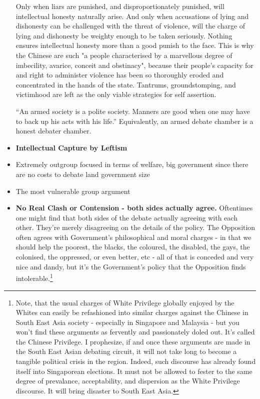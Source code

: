 \begin{itemize}
Only when liars are punished, and disproportionately punished, will intellectual honesty naturally arise. And only when accusations of lying and dishonesty can be challenged with the threat of violence, will the charge of lying and dishonesty be weighty enough to be taken seriously. Nothing ensures intellectual honesty more than a good punish to the face. This is why the Chinese are such "a people characterised by a marvellous degree of imbecility, avarice, conceit and obstinacy", because their people's capacity for and right to administer violence has been so thoroughly eroded and concentrated in the hands of the state. Tantrums, groundstomping, and victimhood are left as the only viable strategies for self assertion.

“An armed society is a polite society. Manners are good when one may have to back up his acts with his life.” Equivalently, an armed debate chamber is a honest debater chamber. 



\item \textbf{Intellectual Capture by Leftism}
     \item Extremely outgroup focused in terms of welfare, big government since there are no costs to debate land government size
     \item The most vulnerable group argument


\item \textbf{No Real Clash or Contension - both sides actually agree.} Oftentimes one might find that both sides of the debate actually agreeing with each other. They're merely disagreeing on the details of the policy. The Opposition often agrees with Government's philosophical and moral charges - in that we should help the poorest, the blacks, the coloured, the disabled, the gays, the colonised, the oppressed, or even better, etc - all of that is conceded and very nice and dandy, but it's the Government's policy that the Opposition finds intolerable.\footnote{Note, that the usual charges of White Privilege globally enjoyed by the Whites can easily be refashioned into similar charges against the Chinese in South East Asia society - especially in Singapore and Malaysia - but you won't find these arguments as fervently and passionately doled out. It's called the Chinese Privilege. I prophesize, if and once these arguments are made in the South East Asian debating circuit, it will not take long to become a tangible political crisis in the region. Indeed, such discourse has already found itself into Singaporean elections. It must not be allowed to fester to the same degree of prevalance, acceptability, and dispersion as the White Privilege discourse. It will bring disaster to South East Asia.}
    

\end{itemize}

